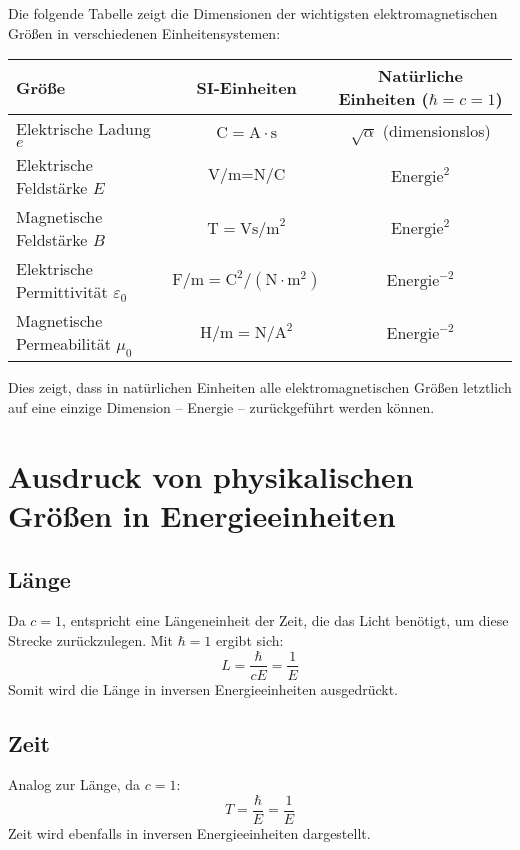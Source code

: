 \documentclass{article}
\begin{document}
	Die folgende Tabelle zeigt die Dimensionen der wichtigsten elektromagnetischen Größen in verschiedenen Einheitensystemen:
	
	\begin{center}
		\begin{tabular}{|l|c|c|}
			\hline
			\textbf{Größe} & \textbf{SI-Einheiten} & \textbf{Natürliche Einheiten} ($\hbar = c = 1$) \\
			\hline
			Elektrische Ladung $e$ & $\text{C} = \text{A} \cdot \text{s}$ & $\sqrt{\alpha}$ (dimensionslos) \\
			Elektrische Feldstärke $E$ & $\text{V/m} = \text{N/C}$ & $\text{Energie}^2$ \\
			Magnetische Feldstärke $B$ & $\text{T} = \text{Vs/m}^2$ & $\text{Energie}^2$ \\
			Elektrische Permittivität $\varepsilon_0$ & $\text{F/m} = \text{C}^2/(\text{N} \cdot \text{m}^2)$ & $\text{Energie}^{-2}$ \\
			Magnetische Permeabilität $\mu_0$ & $\text{H/m} = \text{N}/\text{A}^2$ & $\text{Energie}^{-2}$ \\
			\hline
		\end{tabular}
	\end{center}
	
	Dies zeigt, dass in natürlichen Einheiten alle elektromagnetischen Größen letztlich auf eine einzige Dimension – Energie – zurückgeführt werden können.
	
	
	\section{Ausdruck von physikalischen Größen in Energieeinheiten}
	
	\subsection{Länge}
	Da $c=1$, entspricht eine Längeneinheit der Zeit, die das Licht benötigt, um diese Strecke zurückzulegen. Mit $\hbar=1$ ergibt sich:
	\begin{equation}
		L = \frac{\hbar}{cE} = \frac{1}{E}
	\end{equation}
	Somit wird die Länge in inversen Energieeinheiten ausgedrückt.
	
	\subsection{Zeit}
	Analog zur Länge, da $c=1$:
	\begin{equation}
		T = \frac{\hbar}{E} = \frac{1}{E}
	\end{equation}
	Zeit wird ebenfalls in inversen Energieeinheiten dargestellt.
	
\end{document}
